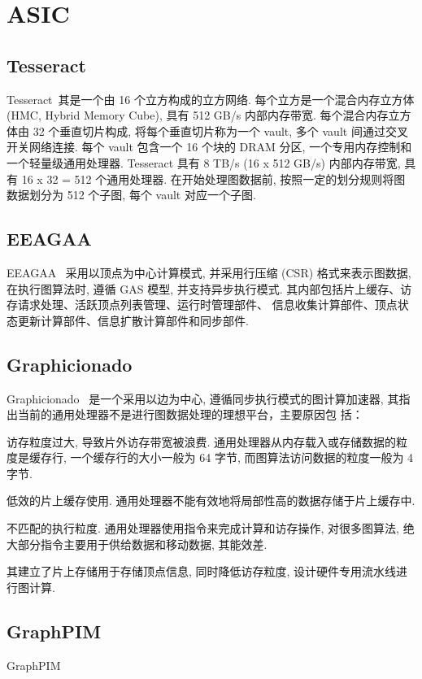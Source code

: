 \documentclass[UTF8,12pt,a4paper]{article}
\begin{document}
\clearpage

\section{ASIC}
\subsection{Tesseract}
Tesseract~\cite{DBLP:conf/isca/AhnHYMC15}其是一个由 16 个立方构成的立方网络.
每个立方是一个混合内存立方体(HMC, Hybrid Memory Cube), 具有 512 GB/s 内部内存带宽.
每个混合内存立方体由 32 个垂直切片构成, 将每个垂直切片称为一个 vault, 多个 vault 间通过交叉开关网络连接.
每个 vault 包含一个 16 个块的 DRAM 分区, 一个专用内存控制和一个轻量级通用处理器.
Tesseract 具有 8 TB/s (16 x 512 GB/s) 内部内存带宽, 具有 16 x 32 = 512 个通用处理器.
在开始处理图数据前, 按照一定的划分规则将图数据划分为 512 个子图, 每个 vault 对应一个子图.

\subsection{EEAGAA}
EEAGAA~\cite{DBLP:conf/isca/OzdalYKAGBO16} 采用以顶点为中心计算模式,
并采用行压缩 (CSR) 格式来表示图数据, 在执行图算法时, 遵循 GAS 模型, 并支持异步执行模式.
其内部包括片上缓存、访存请求处理、活跃顶点列表管理、运行时管理部件、
信息收集计算部件、顶点状态更新计算部件、信息扩散计算部件和同步部件.

\subsection{Graphicionado}
Graphicionado~\cite{DBLP:conf/micro/HamWSSM16}
是一个采用以边为中心, 遵循同步执行模式的图计算加速器,
其指出当前的通用处理器不是进行图数据处理的理想平台，主要原因包
括：
\begin{compactitem}
  \item 访存粒度过大, 导致片外访存带宽被浪费.
  通用处理器从内存载入或存储数据的粒度是缓存行,
  一个缓存行的大小一般为 64 字节, 而图算法访问数据的粒度一般为 4 字节.
  \item 低效的片上缓存使用. 通用处理器不能有效地将局部性高的数据存储于片上缓存中.
  \item 不匹配的执行粒度. 通用处理器使用指令来完成计算和访存操作,
  对很多图算法, 绝大部分指令主要用于供给数据和移动数据, 其能效差.
\end{compactitem}
其建立了片上存储用于存储顶点信息, 同时降低访存粒度, 设计硬件专用流水线进行图计算.

\subsection{GraphPIM}
GraphPIM~\cite{DBLP:conf/hpca/NaiHSKKK17}
\end{document}
